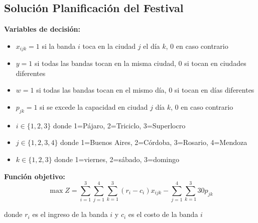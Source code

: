 \documentclass[12pt]{article}
\begin{document}
\subsection{Solución Planificación del Festival}

\textbf{Variables de decisión:}
\begin{itemize}
    \item $x_{ijk} = 1$ si la banda $i$ toca en la ciudad $j$ el día $k$, 0 en caso contrario
    \item $y = 1$ si todas las bandas tocan en la misma ciudad, 0 si tocan en ciudades diferentes
    \item $w = 1$ si todas las bandas tocan en el mismo día, 0 si tocan en días diferentes
    \item $p_{jk} = 1$ si se excede la capacidad en ciudad $j$ día $k$, 0 en caso contrario
    \item $i \in \{1, 2, 3\}$ donde 1=Pájaro, 2=Triciclo, 3=Superlocro
    \item $j \in \{1, 2, 3, 4\}$ donde 1=Buenos Aires, 2=Córdoba, 3=Rosario, 4=Mendoza
    \item $k \in \{1, 2, 3\}$ donde 1=viernes, 2=sábado, 3=domingo
\end{itemize}

\textbf{Función objetivo:}
$$\max Z = \sum_{i=1}^{3} \sum_{j=1}^{4} \sum_{k=1}^{3} (r_i - c_i) x_{ijk} - \sum_{j=1}^{4} \sum_{k=1}^{3} 30p_{jk}$$
\begin{center}
donde $r_i$ es el ingreso de la banda $i$ y $c_i$ es el costo de la banda $i$
\end{center}
\end{document}
